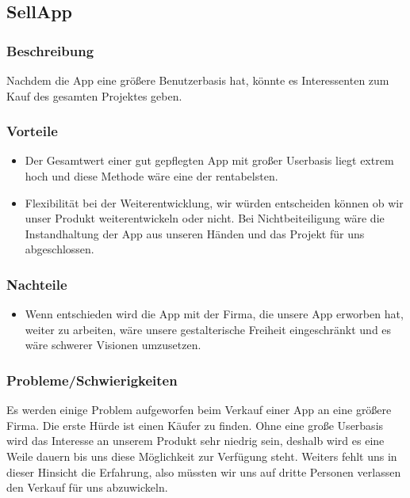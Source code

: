 \documentclass[FIPLY_base.tex]{subfiles}
\begin{document}
\subsection{SellApp}


\subsubsection{Beschreibung}
Nachdem die App eine größere Benutzerbasis hat, könnte es Interessenten zum Kauf des gesamten Projektes geben.


\subsubsection{Vorteile}
\begin{itemize}
\item Der Gesamtwert einer gut gepflegten App mit großer Userbasis liegt extrem hoch und diese Methode wäre eine der rentabelsten.
\item Flexibilität bei der Weiterentwicklung, wir würden entscheiden können ob wir unser Produkt weiterentwickeln oder nicht. Bei Nichtbeiteiligung wäre die Instandhaltung der App aus unseren Händen und das Projekt für uns abgeschlossen.
\end{itemize}

\subsubsection{Nachteile}
\begin{itemize}
\item Wenn entschieden wird die App mit der Firma, die unsere App erworben hat, weiter zu arbeiten, wäre unsere gestalterische Freiheit eingeschränkt und es wäre schwerer Visionen umzusetzen.
\end{itemize}


\subsubsection{Probleme/Schwierigkeiten}
Es werden einige Problem aufgeworfen beim Verkauf einer App an eine größere Firma. Die erste Hürde ist einen Käufer zu finden.
Ohne eine große Userbasis wird das Interesse an unserem Produkt sehr niedrig sein, deshalb wird es eine Weile dauern bis uns diese Möglichkeit zur Verfügung steht.
Weiters fehlt uns in dieser Hinsicht die Erfahrung, also müssten wir uns auf dritte Personen verlassen den Verkauf für uns abzuwickeln.
\end{document}
